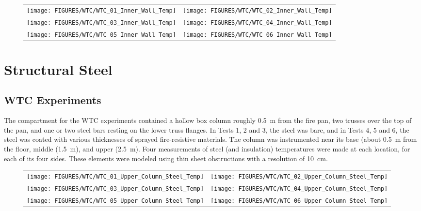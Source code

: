\begin{figure}[p]
\begin{tabular*}{\textwidth}{l@{\extracolsep{\fill}}r}
\texttt{[image: FIGURES/WTC/WTC\_01\_Inner\_Wall\_Temp]} &
\texttt{[image: FIGURES/WTC/WTC\_02\_Inner\_Wall\_Temp]} \\
\texttt{[image: FIGURES/WTC/WTC\_03\_Inner\_Wall\_Temp]} &
\texttt{[image: FIGURES/WTC/WTC\_04\_Inner\_Wall\_Temp]} \\
\texttt{[image: FIGURES/WTC/WTC\_05\_Inner\_Wall\_Temp]} &
\texttt{[image: FIGURES/WTC/WTC\_06\_Inner\_Wall\_Temp]}
\end{tabular*}
\label{NIST_WTC_Inner_Wall}
\end{figure}

\clearpage


\section{Structural Steel}



\subsection{WTC Experiments}

The compartment for the WTC experiments contained a hollow box column roughly 0.5~m from the fire pan, two trusses over the top of the pan, and one or two steel bars resting on the lower truss flanges. In Tests 1, 2 and 3, the steel was bare, and in Tests 4, 5 and 6, the steel was coated with various thicknesses of sprayed fire-resistive materials. The column was instrumented near its base (about 0.5~m from the floor, middle (1.5~m), and upper (2.5~m). Four measurements of steel (and insulation) temperatures were made at each location, for each of its four sides. These elements were modeled using thin sheet obstructions with a resolution of 10~cm.

\newpage

\begin{figure}[p]
\begin{tabular*}{\textwidth}{l@{\extracolsep{\fill}}r}
\texttt{[image: FIGURES/WTC/WTC\_01\_Upper\_Column\_Steel\_Temp]} &
\texttt{[image: FIGURES/WTC/WTC\_02\_Upper\_Column\_Steel\_Temp]} \\
\texttt{[image: FIGURES/WTC/WTC\_03\_Upper\_Column\_Steel\_Temp]} &
\texttt{[image: FIGURES/WTC/WTC\_04\_Upper\_Column\_Steel\_Temp]} \\
\texttt{[image: FIGURES/WTC/WTC\_05\_Upper\_Column\_Steel\_Temp]} &
\texttt{[image: FIGURES/WTC/WTC\_06\_Upper\_Column\_Steel\_Temp]}
\end{tabular*}
\label{NIST_WTC_Upper_Column_Steel}
\end{figure}

